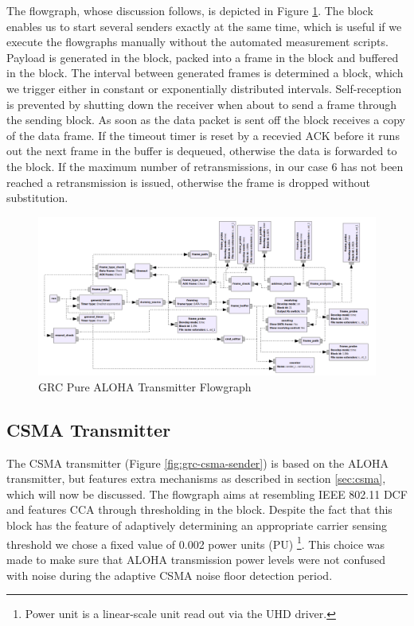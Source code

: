 The flowgraph, whose discussion follows, is depicted in Figure \ref{fig:grc-aloha-sender}. The  block enables us to start several senders exactly at the same time, which is useful if we execute the flowgraphs manually without the automated measurement scripts. Payload is generated in the  block, packed into a frame in the  block and buffered in the  block. The interval between generated frames is determined a  block, which we trigger either in constant or exponentially distributed intervals. Self-reception is prevented by shutting down the receiver when about to send a frame through the sending block. As soon as the data packet is sent off the  block receives a copy of the data frame. If the timeout timer is reset by a recevied ACK before it runs out the next frame in the buffer is dequeued, otherwise the data is forwarded to the  block. If the maximum number of retransmissions, in our case 6 has not been reached a retransmission is issued, otherwise the frame is dropped without substitution.

\begin{figure}
	\label{fig:grc-aloha-sender}
	\begin{center}
		\includegraphics[width=\textwidth]{pictures/grc_aloha_transmitter_flowgraph}
\end{center}
\caption{GRC Pure ALOHA Transmitter Flowgraph}
\end{figure}

\subsection{CSMA Transmitter}
\label{sec:csma-transmiter}

The CSMA transmitter (Figure \ref{fig:grc-csma-sender}) is based on the ALOHA transmitter, but features extra mechanisms as described in section \ref{sec:csma}, which will now be discussed. The flowgraph aims at resembling IEEE 802.11 DCF and features CCA through thresholding in the  block. Despite the fact that this block has the feature of adaptively determining an appropriate carrier sensing threshold we chose a fixed value of 0.002 power units (PU) \footnote{Power unit is a linear-scale unit read out via the UHD driver.}. This choice was made to make sure that ALOHA transmission power levels were not confused with noise during the adaptive CSMA noise floor detection period. 

